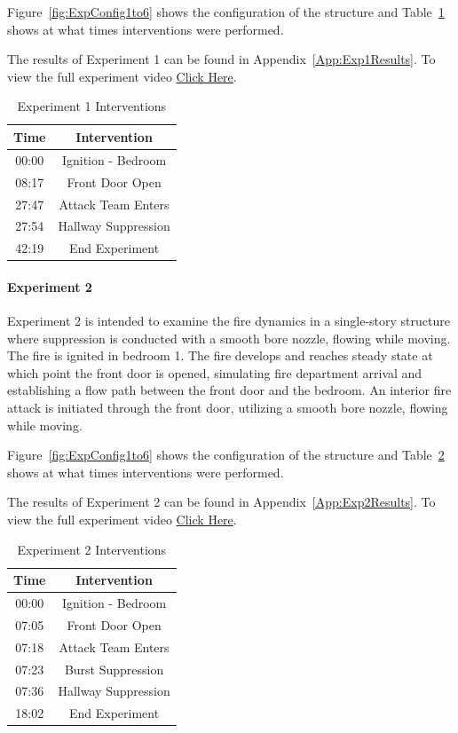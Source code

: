 \documentclass[12pt,oneside]{book}
\begin{document}
Figure~\ref{fig:ExpConfig1to6} shows the configuration of the structure and Table~\ref{Table:Exp1Interventions} shows at what times interventions were performed. 

The results of Experiment 1 can be found in Appendix~\ref{App:Exp1Results}. To view the full experiment video \href{https://youtu.be/gl8rc1Nsl1k}{Click Here}.

\begin{table}[H]
	\centering
	\caption{Experiment 1 Interventions}
	\begin{tabular}{|c|c|} 
		\hline
		Time & Intervention \\ \hline \hline
		00:00 & Ignition - Bedroom \\ \hline
		08:17 & Front Door Open \\ \hline
		27:47 & Attack Team Enters\\ \hline
		27:54 & Hallway Suppression \\ \hline
		42:19 & End Experiment\\ \hline
	\end{tabular}
	\label{Table:Exp1Interventions}
\end{table}

\clearpage

\paragraph{Experiment 2} \mbox{}

Experiment 2 is intended to examine the fire dynamics in a single-story structure where suppression is conducted with a smooth bore nozzle, flowing while moving. The fire is ignited in bedroom 1. The fire develops and reaches steady state at which point the front door is opened, simulating fire department arrival and establishing a flow path between the front door and the bedroom. An interior fire attack is initiated through the front door, utilizing a smooth bore nozzle, flowing while moving. 

Figure~\ref{fig:ExpConfig1to6} shows the configuration of the structure and Table~\ref{Table:Exp2Interventions} shows at what times interventions were performed. 

The results of Experiment 2 can be found in Appendix~\ref{App:Exp2Results}. To view the full experiment video \href{https://youtu.be/gl8rc1Nsl1k}{Click Here}.

\begin{table}[H]
	\centering
	\caption{Experiment 2 Interventions}
	\begin{tabular}{|c|c|} 
		\hline
		Time & Intervention \\ \hline \hline
		00:00 & Ignition - Bedroom \\ \hline
		07:05 & Front Door Open \\ \hline
		07:18 & Attack Team Enters\\ \hline
		07:23 & Burst Suppression \\ \hline 
		07:36 & Hallway Suppression \\ \hline
		18:02 & End Experiment\\ \hline
	\end{tabular}
	\label{Table:Exp2Interventions}
\end{table}
\end{document}
